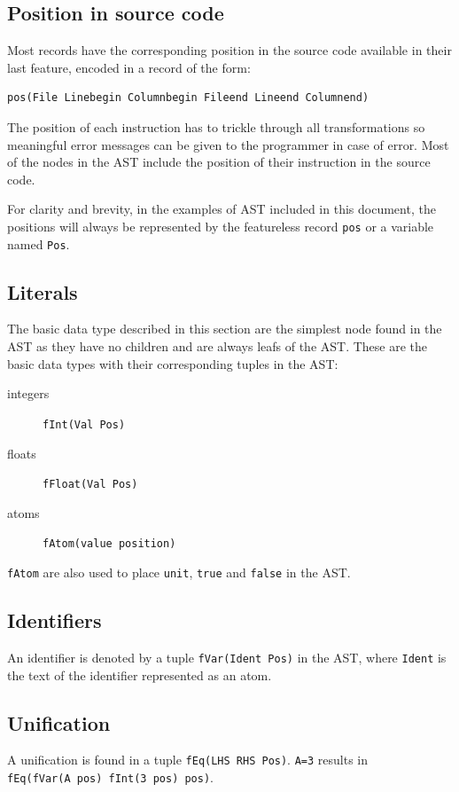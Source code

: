 \documentclass[a4paper]{memoir}
\begin{document}
\subsection{Position in source code}
Most records have the corresponding position in the source code available in
their last feature, encoded in a record of the form:
\begin{lstlisting}
pos(File Linebegin Columnbegin Fileend Lineend Columnend)
\end{lstlisting}
The position of each instruction has to trickle through all transformations so meaningful error messages can be given to the programmer in case of error.
Most of the nodes in the AST include the position of their instruction in the
source code.

For clarity and brevity, in the examples of AST included in this document, the
positions will always be represented by the featureless record \lstinline!pos!
or a variable named \lstinline!Pos!. 
\subsection{Literals}
The basic data type described in this section are the simplest node found in the AST as they have no children and are always leafs of the AST.
These are the basic data types with their corresponding tuples in the AST:
\begin{description}
  \item[integers] \lstinline!fInt(Val Pos)!
  \item[floats] \lstinline!fFloat(Val Pos)!
  \item[atoms] \lstinline!fAtom(value position)!
\end{description}

\lstinline!fAtom! are also used to place \lstinline!unit!, \lstinline!true! and
\lstinline!false! in the AST.

\subsection{Identifiers}\label{sec:input:identifiers}
An identifier is denoted by a tuple \lstinline!fVar(Ident Pos)! in the AST,
where \lstinline!Ident! is the text of the identifier represented as an atom.

\subsection{Unification}
A unification is found in a tuple \lstinline!fEq(LHS RHS Pos)!.
\lstinline!A=3! results in \\
\lstinline!fEq(fVar(A pos) fInt(3 pos) pos)!.
\end{document}
